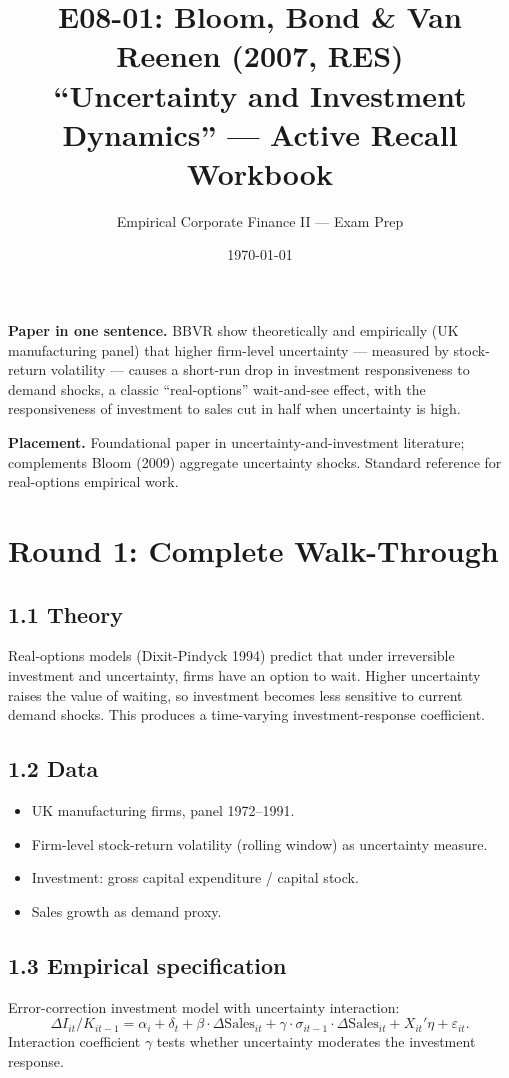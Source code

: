 \documentclass[11pt]{article}
\title{E08-01: Bloom, Bond \& Van Reenen (2007, RES) \\
\large ``Uncertainty and Investment Dynamics'' --- Active Recall Workbook}
\author{Empirical Corporate Finance II --- Exam Prep}
\date{\today}
\begin{document}
\maketitle

\begin{keybox}
\textbf{Paper in one sentence.} BBVR show theoretically and empirically (UK manufacturing panel) that higher firm-level uncertainty --- measured by stock-return volatility --- causes a short-run drop in investment responsiveness to demand shocks, a classic ``real-options'' wait-and-see effect, with the responsiveness of investment to sales cut in half when uncertainty is high.

\textbf{Placement.} Foundational paper in uncertainty-and-investment literature; complements Bloom (2009) aggregate uncertainty shocks. Standard reference for real-options empirical work.
\end{keybox}

\section*{Round 1: Complete Walk-Through}

\subsection*{1.1 Theory}
Real-options models (Dixit-Pindyck 1994) predict that under irreversible investment and uncertainty, firms have an option to wait. Higher uncertainty raises the value of waiting, so investment becomes less sensitive to current demand shocks. This produces a time-varying investment-response coefficient.

\subsection*{1.2 Data}
\begin{itemize}
\item UK manufacturing firms, panel 1972--1991.
\item Firm-level stock-return volatility (rolling window) as uncertainty measure.
\item Investment: gross capital expenditure / capital stock.
\item Sales growth as demand proxy.
\end{itemize}

\subsection*{1.3 Empirical specification}
Error-correction investment model with uncertainty interaction:
\[
\Delta I_{it}/K_{it-1}=\alpha_i+\delta_t+\beta\cdot\Delta\text{Sales}_{it}+\gamma\cdot\sigma_{it-1}\cdot\Delta\text{Sales}_{it}+X_{it}'\eta+\varepsilon_{it}.
\]
Interaction coefficient $\gamma$ tests whether uncertainty moderates the investment response.
\end{document}
